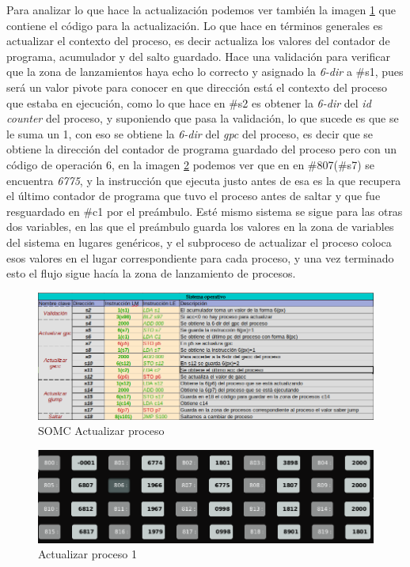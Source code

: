 \documentclass[letterpaper,12pt,oneside]{book}
\begin{document}
		Para analizar lo que hace la actualización podemos ver también la imagen  \ref{fig:somcActualizarProceso1} 	que contiene el código para la actualización. Lo
		que hace en términos generales es actualizar el contexto del proceso, es decir actualiza los valores del contador de programa, acumulador y del
		salto guardado. Hace una validación para verificar que la zona de lanzamientos haya echo lo correcto y asignado la \textit{6-dir} a \#s1, pues
		será un valor pivote para conocer en que dirección está el contexto del proceso que estaba en ejecución, como lo que hace en \#s2 es obtener
		la \textit{6-dir} del \textit{id counter} del proceso, y suponiendo que pasa la validación, lo que sucede es que se le suma un 1, con eso
		se obtiene la \textit{6-dir} del \textit{gpc} del proceso, es decir que se obtiene la dirección del contador de programa guardado del proceso
		pero con un código de operación 6, en la imagen \ref{fig:Proceso1ActualizarP1} podemos ver que en en \#807(\#s7) se encuentra \textit{6775}, y
		la instrucción que ejecuta justo antes de esa es la que recupera el último contador de programa que tuvo el proceso antes de saltar y que
		fue resguardado en \#c1 por el preámbulo. Esté mismo sistema se sigue para las otras dos variables, en las que el preámbulo guarda los valores
		en la zona de variables del sistema en lugares genéricos, y el subproceso de actualizar el proceso coloca esos valores en el lugar correspondiente
		para cada proceso, y una vez terminado esto el flujo sigue hacía la zona de lanzamiento de procesos.
		
		
		\begin{figure}[ht]		
			\centering
			\includegraphics[scale=0.55]{media/CARDIACC/SO_ActualizarProceso.png}
			\caption{ SOMC Actualizar proceso }
			\label{fig:somcActualizarProceso1}
		\end{figure}		
		
		
		\begin{figure}[ht]		
			\centering
			\includegraphics[scale=0.45]{media/CARDIACC/Proceso1ActualizarP1.png}
			\caption{ Actualizar proceso 1}
			\label{fig:Proceso1ActualizarP1}
		\end{figure}		
		
\end{document}
